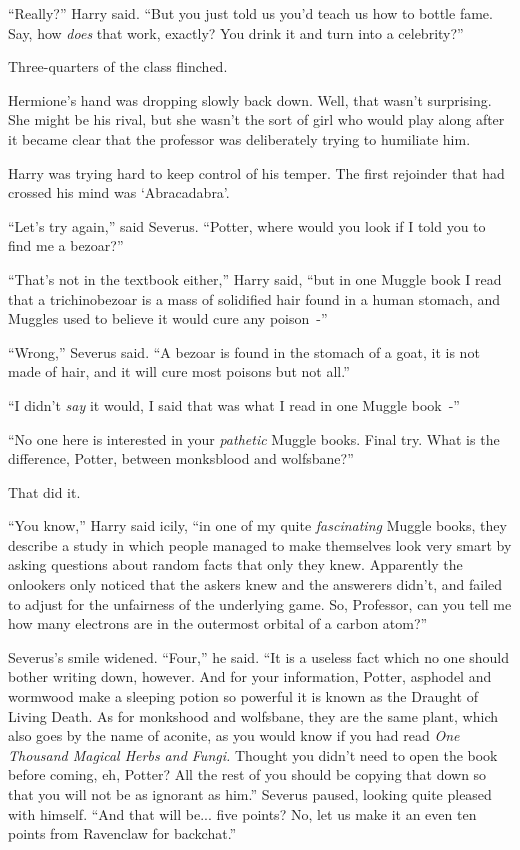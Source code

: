 ``Really?'' Harry said. ``But you just told us you'd teach us how to bottle fame. Say, how \emph{does} that work, exactly? You drink it and turn into a celebrity?''

Three-quarters of the class flinched.

Hermione's hand was dropping slowly back down. Well, that wasn't surprising. She might be his rival, but she wasn't the sort of girl who would play along after it became clear that the professor was deliberately trying to humiliate him.

Harry was trying hard to keep control of his temper. The first rejoinder that had crossed his mind was `Abracadabra'.

``Let's try again,'' said Severus. ``Potter, where would you look if I told you to find me a bezoar?''

``That's not in the textbook either,'' Harry said, ``but in one Muggle book I read that a trichinobezoar is a mass of solidified hair found in a human stomach, and Muggles used to believe it would cure any poison~-''

``Wrong,'' Severus said. ``A bezoar is found in the stomach of a goat, it is not made of hair, and it will cure most poisons but not all.''

``I didn't \emph{say} it would, I said that was what I read in one Muggle book~-''

``No one here is interested in your \emph{pathetic} Muggle books. Final try. What is the difference, Potter, between monksblood and wolfsbane?''

That did it.

``You know,'' Harry said icily, ``in one of my quite \emph{fascinating} Muggle books, they describe a study in which people managed to make themselves look very smart by asking questions about random facts that only they knew. Apparently the onlookers only noticed that the askers knew and the answerers didn't, and failed to adjust for the unfairness of the underlying game. So, Professor, can you tell me how many electrons are in the outermost orbital of a carbon atom?''

Severus's smile widened. ``Four,'' he said. ``It is a useless fact which no one should bother writing down, however. And for your information, Potter, asphodel and wormwood make a sleeping potion so powerful it is known as the Draught of Living Death. As for monkshood and wolfsbane, they are the same plant, which also goes by the name of aconite, as you would know if you had read \emph{One Thousand Magical Herbs and Fungi.} Thought you didn't need to open the book before coming, eh, Potter? All the rest of you should be copying that down so that you will not be as ignorant as him.'' Severus paused, looking quite pleased with himself. ``And that will be... five points? No, let us make it an even ten points from Ravenclaw for backchat.''

